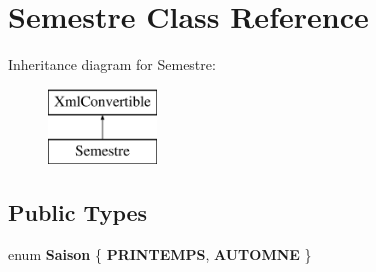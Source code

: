 \hypertarget{classSemestre}{\section{Semestre Class Reference}
\label{classSemestre}
}
Inheritance diagram for Semestre\+:\begin{figure}[H]
\begin{center}
\leavevmode
\includegraphics[height=2.000000cm]{classSemestre}
\end{center}
\end{figure}
\subsection*{Public Types}
\begin{DoxyCompactItemize}
\item 
\hypertarget{classSemestre_a1f4bcf95773a68fb7538c01c11a8cd7e}{enum {\bfseries Saison} \{ {\bfseries P\+R\+I\+N\+T\+E\+M\+P\+S}, 
{\bfseries A\+U\+T\+O\+M\+N\+E}
 \}}\label{classSemestre_a1f4bcf95773a68fb7538c01c11a8cd7e}

\end{DoxyCompactItemize}
